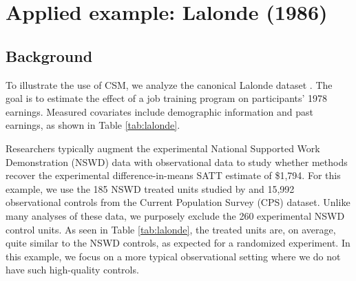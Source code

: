 \documentclass{article}
\begin{document}



\section{Applied example: Lalonde (1986)}
\label{sec:lalonde}

\subsection{Background}

To illustrate the use of CSM, we analyze the canonical Lalonde dataset \citep{lalonde1986evaluating}.
The goal is to estimate the effect of a job training program on participants' 1978 earnings.
Measured covariates include demographic information and past earnings, as shown in Table \ref{tab:lalonde}.

Researchers typically augment the experimental National Supported Work Demonstration (NSWD) data with observational data to study whether methods recover the experimental difference-in-means SATT estimate of \$1,794.
For this example, we use the 185 NSWD treated units studied by \citet{dehejia1999causal} and 15,992 observational controls from the Current Population Survey (CPS) dataset.
Unlike many analyses of these data, we purposely exclude the 260 experimental NSWD control units.
As seen in Table \ref{tab:lalonde}, the treated units are, on average, quite similar to the NSWD controls, as expected for a randomized experiment.
In this example, we focus on a more typical observational setting where we do not have such high-quality controls.
\end{document}
